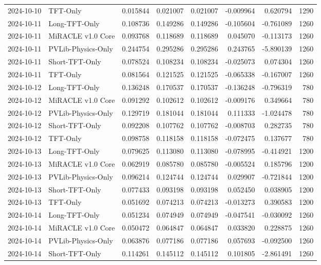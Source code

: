 \begin{tabular}{llrrrrrr}
2024-10-10 & TFT-Only & 0.015844 & 0.021007 & 0.021007 & -0.009964 & 0.620794 & 1290 \\
2024-10-11 & Long-TFT-Only & 0.108736 & 0.149286 & 0.149286 & -0.105604 & -0.761089 & 1260 \\
2024-10-11 & MiRACLE v1.0 Core & 0.093768 & 0.118689 & 0.118689 & 0.045070 & -0.113173 & 1260 \\
2024-10-11 & PVLib-Physics-Only & 0.244754 & 0.295286 & 0.295286 & 0.243765 & -5.890139 & 1260 \\
2024-10-11 & Short-TFT-Only & 0.078524 & 0.108234 & 0.108234 & -0.025073 & 0.074304 & 1260 \\
2024-10-11 & TFT-Only & 0.081564 & 0.121525 & 0.121525 & -0.065338 & -0.167007 & 1260 \\
2024-10-12 & Long-TFT-Only & 0.136248 & 0.170537 & 0.170537 & -0.136248 & -0.796319 & 780 \\
2024-10-12 & MiRACLE v1.0 Core & 0.091292 & 0.102612 & 0.102612 & -0.009176 & 0.349664 & 780 \\
2024-10-12 & PVLib-Physics-Only & 0.129719 & 0.181044 & 0.181044 & 0.111333 & -1.024478 & 780 \\
2024-10-12 & Short-TFT-Only & 0.092208 & 0.107762 & 0.107762 & -0.008703 & 0.282735 & 780 \\
2024-10-12 & TFT-Only & 0.098758 & 0.118158 & 0.118158 & -0.072475 & 0.137677 & 780 \\
2024-10-13 & Long-TFT-Only & 0.079625 & 0.113080 & 0.113080 & -0.078995 & -0.414921 & 1200 \\
2024-10-13 & MiRACLE v1.0 Core & 0.062919 & 0.085780 & 0.085780 & -0.005524 & 0.185796 & 1200 \\
2024-10-13 & PVLib-Physics-Only & 0.096214 & 0.124744 & 0.124744 & 0.029907 & -0.721844 & 1200 \\
2024-10-13 & Short-TFT-Only & 0.077433 & 0.093198 & 0.093198 & 0.052450 & 0.038905 & 1200 \\
2024-10-13 & TFT-Only & 0.051692 & 0.074213 & 0.074213 & -0.013273 & 0.390583 & 1200 \\
2024-10-14 & Long-TFT-Only & 0.051234 & 0.074949 & 0.074949 & -0.047541 & -0.030092 & 1260 \\
2024-10-14 & MiRACLE v1.0 Core & 0.050472 & 0.064847 & 0.064847 & 0.033820 & 0.228875 & 1260 \\
2024-10-14 & PVLib-Physics-Only & 0.063876 & 0.077186 & 0.077186 & 0.057693 & -0.092500 & 1260 \\
2024-10-14 & Short-TFT-Only & 0.114261 & 0.145112 & 0.145112 & 0.101805 & -2.861491 & 1260 \\

\end{tabular}
